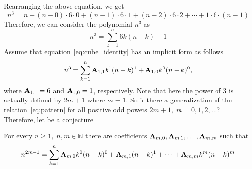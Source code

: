 Rearranging the above equation, we get
\[
    n^3 = n +(n-0) \cdot6 \cdot0 + (n-1)\cdot6\cdot1 + (n-2)\cdot6\cdot2 + \cdots+1\cdot6\cdot(n-1)
\]
Therefore, we can consider the polynomial $n^3$ as
\begin{equation}
    \label{eq:cube_identity}
    n^3 = \sum_{k=1}^{n} 6k(n-k) + 1
\end{equation}
Assume that equation~\eqref{eq:cube_identity} has an implicit form as follows
\begin{equation}
    \label{eq:pattern}
    n^3 = \sum_{k=1}^{n} {\mathbf{A}} \sb{1,1} k^1(n-k)^1 + {\mathbf{A}} \sb{1,0} k^0(n-k)^0,
\end{equation}
where ${\mathbf{A}} \sb{1,1} = 6$ and ${\mathbf{A}} \sb{1,0} = 1$, respectively.
Note that here the power of $3$ is actually defined by $2m+1$ where $m=1$.
So is there a generalization of the relation~\eqref{eq:pattern} for all positive odd powers $2m+1, \; m=0,1,2,\dots$?
Therefore, let be a conjecture
\begin{conj}
    For every $n\geq 1, \; n,m\in\mathbb{N}$ there are coefficients ${\mathbf{A}} \sb{m,0}, {\mathbf{A}} \sb{m,1}, \ldots, {\mathbf{A}} \sb{m,m}$ such that
    \begin{equation*}
        n^{2m+1} = \sum_{k=1}^{n} {\mathbf{A}} \sb{m,0} k^0 (n-k)^0 + {\mathbf{A}} \sb{m,1} (n-k)^1
        + \cdots + {\mathbf{A}} \sb{m,m} k^m (n-k)^m
    \end{equation*}
\end{conj}